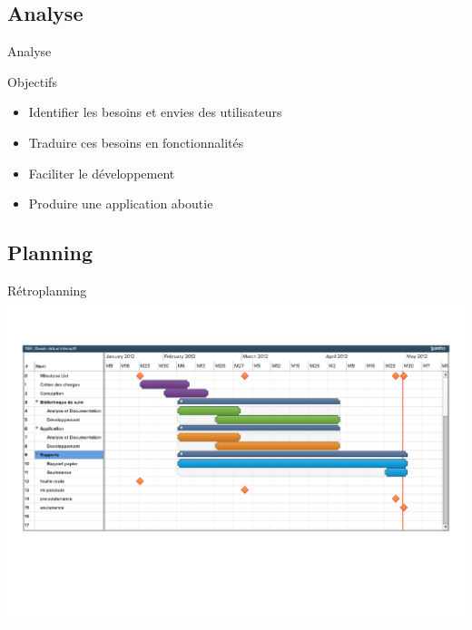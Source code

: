 \documentclass{beamer}
\begin{document}
      \subsection{Analyse}
            \begin{frame}{Analyse}
                  \begin{exampleblock}{Objectifs}
                        \begin{itemize}
                              \item{Identifier les besoins et envies des utilisateurs}
                              \item{Traduire ces besoins en fonctionnalités}
                              \item{Faciliter le développement}
			      \item{Produire une application aboutie }
                        \end{itemize}
                  \end{exampleblock}
            \end{frame}
      
      \subsection{Planning}
            \begin{frame}{Rétroplanning}      
                  \includegraphics[scale=0.40]{./retro-planning.pdf}
            \end{frame}
\end{document}
